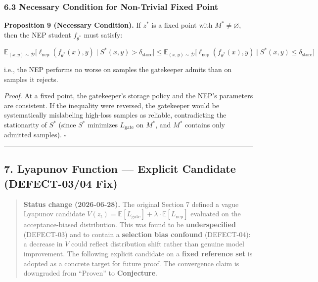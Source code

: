 \documentclass[
  12pt,
]{article}
\begin{document}
\subsubsection{6.3 Necessary Condition for Non-Trivial Fixed
Point}\label{necessary-condition-for-non-trivial-fixed-point}

\textbf{Proposition 9 (Necessary Condition).} If \(z^*\) is a fixed
point with \(M^* \neq \varnothing\), then the NEP student
\(f_{\theta^*}\) must satisfy:

\[\mathbb{E}_{(x,y) \sim \mathcal{D}}\bigl[ \ell_{\text{nep}}(f_{\theta^*}(x), y) \mid S^*(x,y) > \delta_{\text{store}} \bigr] \leq \mathbb{E}_{(x,y) \sim \mathcal{D}}\bigl[ \ell_{\text{nep}}(f_{\theta^*}(x), y) \mid S^*(x,y) \leq \delta_{\text{store}} \bigr]\]

i.e., the NEP performs no worse on samples the gatekeeper admits than on
samples it rejects.

\emph{Proof.} At a fixed point, the gatekeeper's storage policy and the
NEP's parameters are consistent. If the inequality were reversed, the
gatekeeper would be systematically mislabeling high-loss samples as
reliable, contradicting the stationarity of \(S^*\) (since \(S^*\)
minimizes \(L_{\text{gate}}\) on \(M^*\), and \(M^*\) contains only
admitted samples). \(\square\)

\begin{center}\rule{0.5\linewidth}{0.5pt}\end{center}

\subsection{7. Lyapunov Function --- Explicit Candidate (DEFECT-03/04
Fix)}\label{lyapunov-function-explicit-candidate-defect-0304-fix}

\begin{quote}
\textbf{Status change (2026-06-28).} The original Section 7 defined a
vague Lyapunov candidate
\(V(z_t) = \mathbb{E}[L_{\text{gate}}] + \lambda \cdot \mathbb{E}[L_{\text{nep}}]\)
evaluated on the acceptance-biased distribution. This was found to be
\textbf{underspecified} (DEFECT-03) and to contain a \textbf{selection
bias confound} (DEFECT-04): a decrease in \(V\) could reflect
distribution shift rather than genuine model improvement. The following
explicit candidate on a \textbf{fixed reference set} is adopted as a
concrete target for future proof. The convergence claim is downgraded
from ``Proven'' to \textbf{Conjecture}.
\end{quote}
\end{document}

